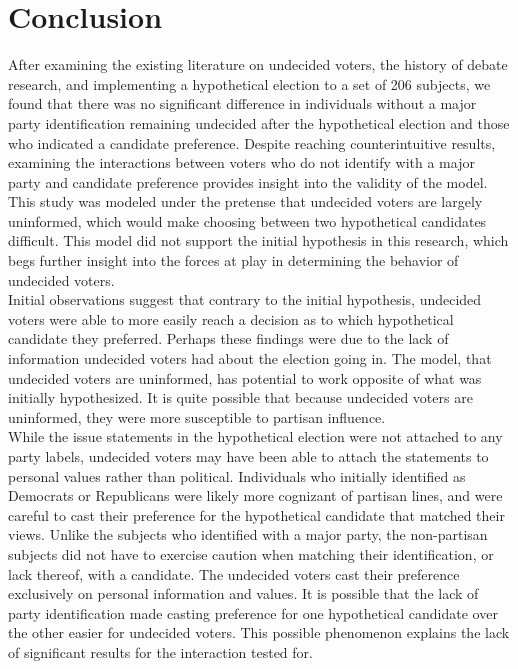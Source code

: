\documentclass[12pt]{article}
\begin{document}
{{{{\section*{Conclusion}

After examining the existing literature on undecided voters, the history of debate research, and implementing a hypothetical election to a set of 206 subjects, we found that there was no significant difference in individuals without a major party identification remaining undecided after the hypothetical election and those who indicated a candidate preference. Despite reaching counterintuitive results, examining the interactions between voters who do not identify with a major party and candidate preference provides insight into the validity of the model. This study was modeled under the pretense that undecided voters are largely uninformed, which would make choosing between two hypothetical candidates difficult. This model did not support the initial hypothesis in this research, which begs further insight into the forces at play in determining the behavior of undecided voters. \\

Initial observations suggest that contrary to the initial hypothesis, undecided voters were able to more easily reach a decision as to which hypothetical candidate they preferred. Perhaps these findings were due to the lack of information undecided voters had about the election going in. The model, that undecided voters are uninformed, has potential to work opposite of what was initially hypothesized. It is quite possible that because undecided voters are uninformed, they were more susceptible to partisan influence. \\

While the issue statements in the hypothetical election were not attached to any party labels, undecided voters may have been able to attach the statements to personal values rather than political. Individuals who initially identified as Democrats or Republicans were likely more cognizant of partisan lines, and were careful to cast their preference for the hypothetical candidate that matched their views. Unlike the subjects who identified with a major party, the non-partisan subjects did not have to exercise caution when matching their identification, or lack thereof, with a candidate. The undecided voters cast their preference exclusively on personal information and values. It is possible that the lack of party identification made casting preference for one hypothetical candidate over the other easier for undecided voters. This possible phenomenon explains the lack of significant results for the interaction tested for.\\

}}}}
\end{document}
